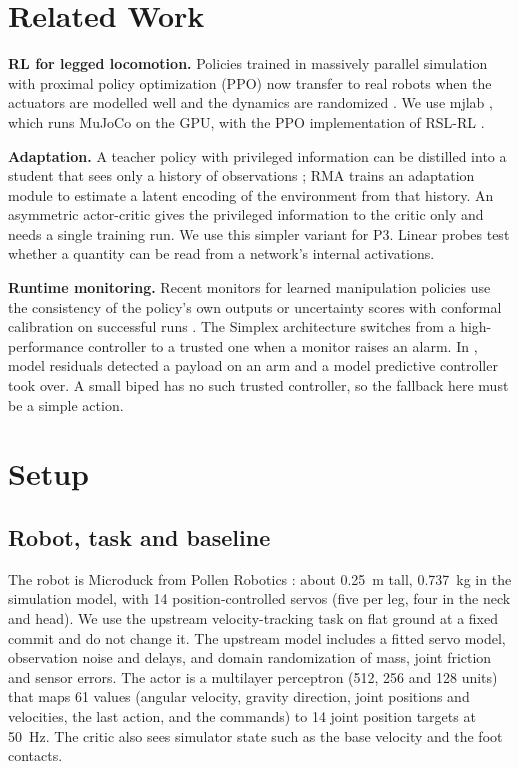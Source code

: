 \documentclass[conference]{IEEEtran}
\begin{document}
\section{Related Work}

\textbf{RL for legged locomotion.} Policies trained in massively parallel simulation \cite{rudin2022learning} with proximal policy optimization (PPO) \cite{schulman2017ppo} now transfer to real robots when the actuators are modelled well \cite{hwangbo2019learning} and the dynamics are randomized \cite{tobin2017domain,peng2018sim}.
We use mjlab \cite{zakka2026mjlab}, which runs MuJoCo \cite{todorov2012mujoco} on the GPU, with the PPO implementation of RSL-RL \cite{schwarke2025rslrl}.

\textbf{Adaptation.} A teacher policy with privileged information can be distilled into a student that sees only a history of observations \cite{lee2020learning}; RMA \cite{kumar2021rma} trains an adaptation module to estimate a latent encoding of the environment from that history.
An asymmetric actor-critic \cite{pinto2018asymmetric} gives the privileged information to the critic only and needs a single training run. We use this simpler variant for P3.
Linear probes \cite{alain2016understanding} test whether a quantity can be read from a network's internal activations.

\textbf{Runtime monitoring.} Recent monitors for learned manipulation policies use the consistency of the policy's own outputs \cite{agia2024sentinel} or uncertainty scores with conformal calibration \cite{angelopoulos2021gentle} on successful runs \cite{romer2025fiper,xu2025faildetect}.
The Simplex architecture \cite{sha2001simplex} switches from a high-performance controller to a trusted one when a monitor raises an alarm.
In \cite{li2026arm}, model residuals detected a payload on an arm and a model predictive controller took over.
A small biped has no such trusted controller, so the fallback here must be a simple action.

\section{Setup}
\label{sec:setup}

\subsection{Robot, task and baseline}

The robot is Microduck from Pollen Robotics \cite{pollen2026microduck}: about \SI{0.25}{m} tall, \SI{0.737}{kg} in the simulation model, with 14 position-controlled servos (five per leg, four in the neck and head).
We use the upstream velocity-tracking task on flat ground at a fixed commit and do not change it.
The upstream model includes a fitted servo model, observation noise and delays, and domain randomization of mass, joint friction and sensor errors.
The actor is a multilayer perceptron (512, 256 and 128 units) that maps 61 values (angular velocity, gravity direction, joint positions and velocities, the last action, and the commands) to 14 joint position targets at \SI{50}{Hz}. The critic also sees simulator state such as the base velocity and the foot contacts.
\end{document}
